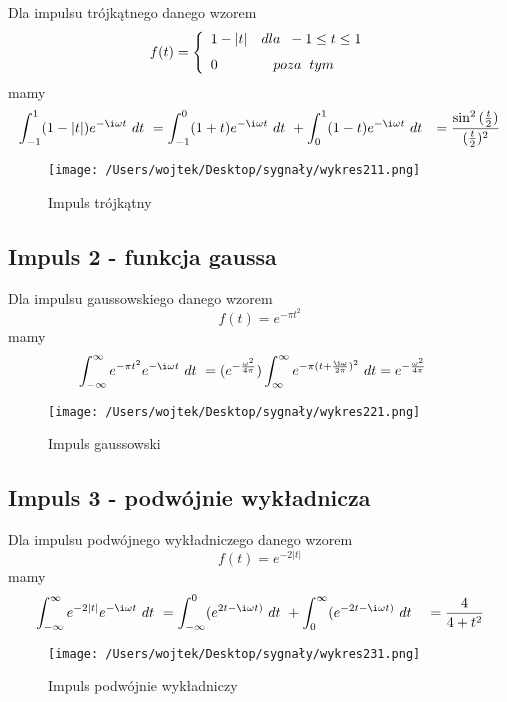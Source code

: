\documentclass[leqno,a4paper]{article}
\begin{document}
Dla impulsu trójkątnego danego wzorem
\[  f(t)= \left\{
\begin{array}{ll}
      1- \left | t \right | &dla\hspace{0.2cm}-1 \leq t\leq 1 \\[1.5ex]
      0 &\hspace{0.3cm}poza\hspace{0.2cm}tym
\end{array}  
\right. \]
mamy
\begin{align*}
\int_{-1}^{1}(1-\left | t \right |)e^{-\i \omega t}\ dt\ &=
\int_{-1}^{0}(1+t)e^{-\i \omega t}\ dt\ + \int_{0}^{1}(1-t)e^{-\i \omega t}\ dt &= 
\frac{\sin ^2{(\frac{t}{2})}}{(\frac{t}{2})^2}
\end{align*}
\newpage
\begin{figure}
  \texttt{[image: /Users/wojtek/Desktop/sygnały/wykres211.png]}
  \centering
  \caption{Impuls trójkątny}
\end{figure}

{}
\subsection*{Impuls 2 - funkcja gaussa}

Dla impulsu gaussowskiego danego wzorem
\begin{equation*}
f(t) = e^{-\pi t^2}
\end{equation*}
mamy
\begin{align*}
\int_{-\infty}^{\infty}e^{-\pi t^2}e^{-\i \omega t}\ dt\ &=
(e^{-\frac{\omega ^2}{4\pi}})\int_{\infty}^{\infty}e^{-\pi (t +\frac{\i \omega}{2\pi})^2}\ dt = e^{-\frac{\omega ^2}{4\pi}}
\end{align*}
\newpage
\begin{figure}
  \texttt{[image: /Users/wojtek/Desktop/sygnały/wykres221.png]}
  \centering
  \caption{Impuls gaussowski}
\end{figure}
{}
\subsection*{Impuls 3 - podwójnie wykładnicza}

Dla impulsu podwójnego wykładniczego danego wzorem
\begin{equation*}
f(t) = e^{-2 \left | t \right |}
\end{equation*}
mamy
\begin{align*}
\int_{-\infty}^{\infty}e^{-2 \left | t \right |}e^{-\i \omega t}\ dt\ &=
\int_{-\infty}^{0}(e^{2t-\i \omega t)}\ dt\ + \int_{0}^{\infty}(e^{-2t-\i \omega t)}\ dt\ &= \frac{4}{4+t^2}
\end{align*}

\begin{figure}
  \texttt{[image: /Users/wojtek/Desktop/sygnały/wykres231.png]}
  \centering
  \caption{Impuls podwójnie wykładniczy}
\end{figure}
\end{document}

